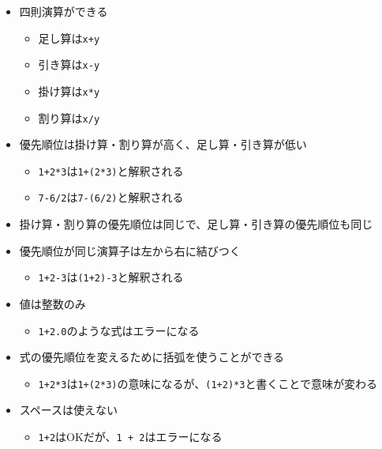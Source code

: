 \begin{itemize}
\tightlist
\item
  四則演算ができる

  \begin{itemize}
  \tightlist
  \item
    足し算は\texttt{x+y}
  \item
    引き算は\texttt{x-y}
  \item
    掛け算は\texttt{x*y}
  \item
    割り算は\texttt{x/y}
  \end{itemize}
\item
  優先順位は掛け算・割り算が高く、足し算・引き算が低い

  \begin{itemize}
  \tightlist
  \item
    \texttt{1+2*3}は\texttt{1+(2*3)}と解釈される
  \item
    \texttt{7-6/2}は\texttt{7-(6/2)}と解釈される
  \end{itemize}
\item
  掛け算・割り算の優先順位は同じで、足し算・引き算の優先順位も同じ
\item
  優先順位が同じ演算子は左から右に結びつく

  \begin{itemize}
  \tightlist
  \item
    \texttt{1+2-3}は\texttt{(1+2)-3}と解釈される
  \end{itemize}
\item
  値は整数のみ

  \begin{itemize}
  \tightlist
  \item
    \texttt{1+2.0}のような式はエラーになる
  \end{itemize}
\item
  式の優先順位を変えるために括弧を使うことができる

  \begin{itemize}
  \tightlist
  \item
    \texttt{1+2*3}は\texttt{1+(2*3)}の意味になるが、\texttt{(1+2)*3}と書くことで意味が変わる
  \end{itemize}
\item
  スペースは使えない

  \begin{itemize}
  \tightlist
  \item
    \texttt{1+2}はOKだが、\texttt{1\ +\ 2}はエラーになる
  \end{itemize}
\end{itemize}

